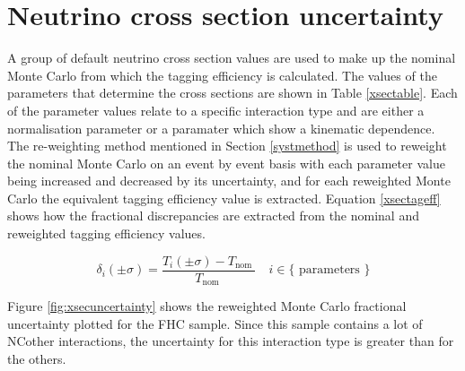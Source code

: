 \section{Neutrino cross section uncertainty}

A group of default neutrino cross section values are used to make up the nominal Monte Carlo from which the tagging efficiency is calculated. The values of the parameters that determine the cross sections are shown in Table \ref{xsectable}. Each of the parameter values relate to a specific interaction type and are either a normalisation parameter or a paramater which show a kinematic dependence. The re-weighting method mentioned in Section \ref{systmethod} is used to reweight the nominal Monte Carlo on an event by event basis with each parameter value being increased and decreased by its uncertainty, and for each reweighted Monte Carlo the equivalent tagging efficiency value is extracted. Equation \eqref{xsectageff} shows how the fractional discrepancies are extracted from the nominal and reweighted tagging efficiency values.

\begin{equation}
\delta_{i}(\pm \sigma)=\frac{T_{i}(\pm \sigma)-T_{\text {nom }}}{T_{\text {nom }}} \quad i \in\{\text { parameters }\}
\label{xsectageff}
\end{equation}

Figure \ref{fig:xsecuncertainty} shows the reweighted Monte Carlo fractional uncertainty plotted for the FHC sample. Since this sample contains a lot of NCother interactions, the uncertainty for this interaction type is greater than for the others.

